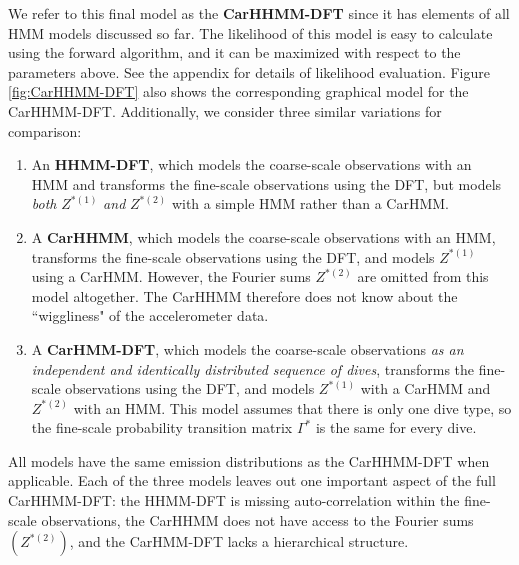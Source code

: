 We refer to this final model as the \textbf{CarHHMM-DFT} since it has elements of all HMM models discussed so far. The likelihood of this model is easy to calculate using the forward algorithm, and it can be maximized with respect to the parameters above. See the appendix for details of likelihood evaluation. Figure \ref{fig:CarHHMM-DFT} also shows the corresponding graphical model for the CarHHMM-DFT. Additionally, we consider three similar variations for comparison:
\begin{enumerate}
    \item An \textbf{HHMM-DFT}, which models the coarse-scale observations with an HMM and transforms the fine-scale observations using the DFT, but models \textit{both} $Z^{*(1)}$ \textit{and} $Z^{*(2)}$ with a simple HMM rather than a CarHMM.
    \item A \textbf{CarHHMM}, which models the coarse-scale observations with an HMM, transforms the fine-scale observations using the DFT, and models $Z^{*(1)}$ using a CarHMM. However, the Fourier sums $Z^{*(2)}$ are omitted from this model altogether. The CarHHMM therefore does not know about the ``wiggliness" of the accelerometer data.
    \item A \textbf{CarHMM-DFT}, which models the coarse-scale observations \textit{as an independent and identically distributed sequence of dives}, transforms the fine-scale observations using the DFT, and models $Z^{*(1)}$ with a CarHMM and $Z^{*(2)}$ with an HMM. This model assumes that there is only one dive type, so the fine-scale probability transition matrix $\Gamma^*$ is the same for every dive. 
\end{enumerate}
All models have the same emission distributions as the CarHHMM-DFT when applicable. Each of the three models leaves out one important aspect of the full CarHHMM-DFT: the HHMM-DFT is missing auto-correlation within the fine-scale observations, the CarHHMM does not have access to the Fourier sums $(Z^{*(2)})$, and the CarHMM-DFT lacks a hierarchical structure.